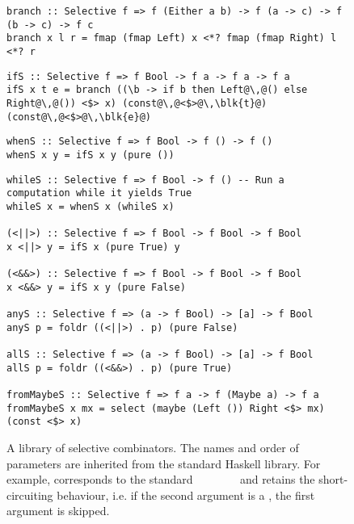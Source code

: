 \begin{figure}
\begin{verbatim}
branch :: Selective f => f (Either a b) -> f (a -> c) -> f (b -> c) -> f c
branch x l r = fmap (fmap Left) x <*? fmap (fmap Right) l <*? r
\end{verbatim}
\vspace{0mm}
\begin{verbatim}
ifS :: Selective f => f Bool -> f a -> f a -> f a
ifS x t e = branch ((\b -> if b then Left@\,@() else Right@\,@()) <$> x) (const@\,@<$>@\,\blk{t}@) (const@\,@<$>@\,\blk{e}@)
\end{verbatim}
\vspace{0mm}
\begin{verbatim}
whenS :: Selective f => f Bool -> f () -> f ()
whenS x y = ifS x y (pure ())
\end{verbatim}
\vspace{0mm}
\begin{verbatim}
whileS :: Selective f => f Bool -> f () -- Run a computation while it yields True
whileS x = whenS x (whileS x)

(<||>) :: Selective f => f Bool -> f Bool -> f Bool
x <||> y = ifS x (pure True) y

(<&&>) :: Selective f => f Bool -> f Bool -> f Bool
x <&&> y = ifS x y (pure False)

anyS :: Selective f => (a -> f Bool) -> [a] -> f Bool
anyS p = foldr ((<||>) . p) (pure False)

allS :: Selective f => (a -> f Bool) -> [a] -> f Bool
allS p = foldr ((<&&>) . p) (pure True)

fromMaybeS :: Selective f => f a -> f (Maybe a) -> f a
fromMaybeS x mx = select (maybe (Left ()) Right <$> mx) (const <$> x)
\end{verbatim}
\vspace{-2mm}
\caption{A library of selective combinators. The names and order of parameters
are inherited from the standard Haskell library. For example, 
corresponds to the standard
~\hs{::}~~\hs{->}~~~\hs{->}~ and
retains the short-circuiting behaviour, i.e. if the second argument is a
, the first argument is skipped.}
\label{fig-library}
\vspace{-2mm}
\end{figure}


